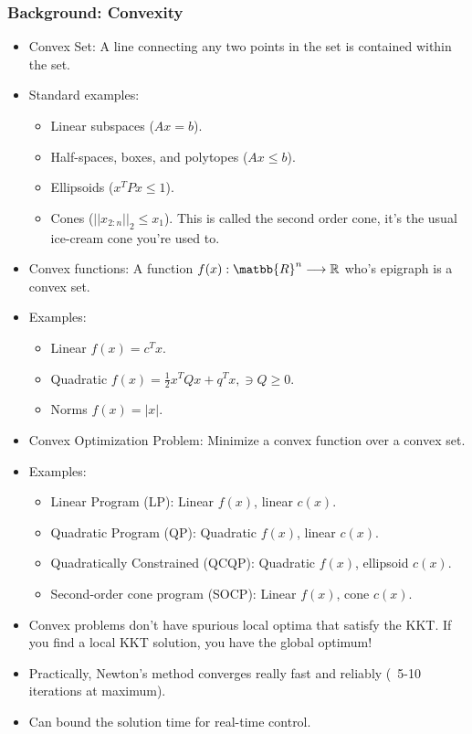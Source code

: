 \subsubsection{Background: Convexity}
\begin{itemize}
    \item Convex Set: A line connecting any two points in the set is contained within the set.
    \item Standard examples:
    \begin{itemize}
        \item Linear subspaces ($Ax=b$). 
        \item Half-spaces, boxes, and polytopes ($Ax\leq b$). 
        \item Ellipsoids ($x^T P x \leq 1$).
        \item Cones ($||x_{2:n}||_2 \leq x_1$). This is called the second order cone, it's the usual ice-cream cone you're used to. 
    \end{itemize}
    \item Convex functions: A function $f(x): \matbb{R}^n \longrightarrow \mathbb{R}$ who's epigraph is a convex set. 
    \item Examples: 
    \begin{itemize}
        \item Linear $f(x) = c^T x$.
        \item Quadratic $f(x) = \frac{1}{2} x^T Q x + q^T x, \ni Q \geq 0$.
        \item Norms $f(x) = |x|$.
    \end{itemize}
    \item Convex Optimization Problem: Minimize a convex function over a convex set. 
    \item Examples:
    \begin{itemize}
        \item Linear Program (LP): Linear $f(x)$, linear $c(x)$.
        \item Quadratic Program (QP): Quadratic $f(x)$, linear $c(x)$. 
        \item Quadratically Constrained (QCQP): Quadratic $f(x)$, ellipsoid $c(x)$. 
        \item Second-order cone program (SOCP): Linear $f(x)$, cone $c(x)$. 
    \end{itemize}
    \item Convex problems don't have spurious local optima that satisfy the KKT. If you find a local KKT solution, you have the global optimum!
    \item Practically, Newton's method converges really fast and reliably (~5-10 iterations at maximum). 
    \item Can bound the solution time for real-time control.
\end{itemize}